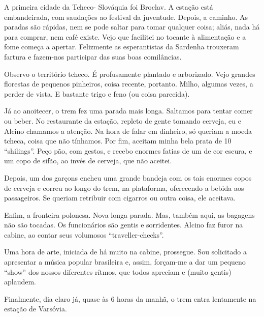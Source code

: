 A primeira cidade da Tcheco- Slováquia foi Broclav. A estação está embandeirada, com saudações ao festival da juventude. Depois, a caminho. As paradas são rápidas, nem se pode saltar para tomar qualquer coisa; aliás, nada há para comprar, nem café existe. Vejo que facilitei no tocante à alimentação e a fome começa a apertar. Felizmente as esperantistas da Sardenha trouxeram fartura e fazem-nos participar das suas boas comilâncias.

Observo o território tcheco. É profusamente plantado e arborizado. Vejo grandes florestas de pequenos pinheiros, coisa recente, portanto. Milho, algumas vezes, a perder de vista. E bastante trigo e feno (ou coisa parecida).

Já ao anoitecer, o trem fez uma parada mais longa. Saltamos para tentar comer ou beber. No restaurante da estação, repleto de gente tomando cerveja, eu e Alcino chamamos a atenção. Na hora de falar em dinheiro, só queriam a moeda tcheca, coisa que não tínhamos. Por fim, aceitam minha bela prata de 10 “shilings”. Peço pão, com gestos, e recebo enormes fatias de um de cor escura, e um copo de sifão, ao invés de cerveja, que não aceitei.

Depois, um dos garçons encheu uma grande bandeja com os tais enormes copos de cerveja e correu ao longo do trem, na plataforma, oferecendo a bebida aos passageiros. Se queriam retribuir com cigarros ou outra coisa, ele aceitava.

Enfim, a fronteira polonesa. Nova longa parada. Mas, também aqui, as bagagens não são tocadas. Os funcionários são gentis e sorridentes. Alcino faz furor na cabine, ao contar seus volumosos “traveller-checks”.

Uma hora de arte, iniciada de há muito na cabine, prossegue. Sou solicitado a apresentar a música popular brasileira e, assim, forçam-me a dar um pequeno “show” dos nossos diferentes rítmos, que todos apreciam e (muito gentis) aplaudem.

Finalmente, dia claro já, quase às 6 horas da manhã, o trem entra lentamente na estação de Varsóvia.
